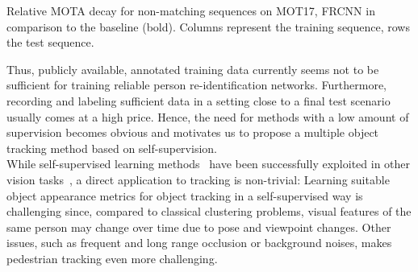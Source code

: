 \begin{table}
	\begin{center}
	{
    \small
		\offinterlineskip
		\hspace*{3mm}
		\hspace*{0.9cm}\par
        \vspace{-0.2cm}
	}
	\vspace*{5mm}
	\caption{Relative MOTA decay for non-matching sequences on MOT17, FRCNN in comparison to the baseline (bold). Columns represent the training sequence, rows the test sequence. 
}
	\vspace*{-5mm}
	\label{tab:supervised_compare}
	\end{center}
\end{table}


Thus, publicly available, annotated training data currently seems not to be sufficient for training reliable person re-identification networks. Furthermore, recording and labeling sufficient data in a setting close to a final test scenario usually comes at a high price. Hence, the need for methods with a low amount of supervision becomes obvious and motivates us to propose a multiple object tracking method based on self-supervision.\\
While self-supervised learning methods~\cite{kolesnikov2019revisiting} have been successfully exploited in other vision tasks~\cite{watch_move,mahendran2018cross,hendrycks2019using,self_pedest,bb_annot,col_vid}, a direct application to tracking is non-trivial: Learning suitable object appearance metrics for object tracking in a self-supervised way is challenging since, compared to classical clustering problems, visual features of the same person may change over time due to pose and viewpoint changes.
Other issues, such as frequent and long range occlusion or background noises, makes pedestrian tracking even more challenging.\\

